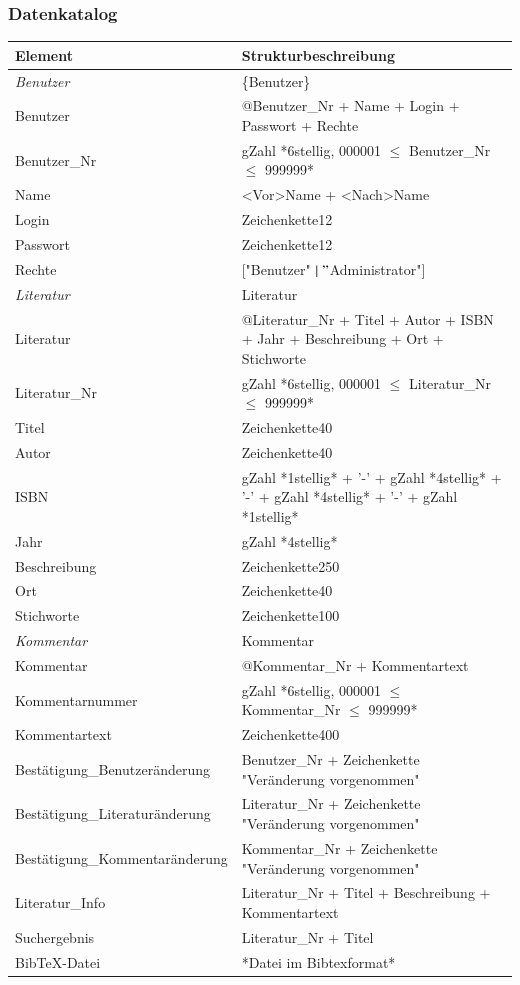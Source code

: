 \subsubsection{Datenkatalog}
\begin{tabular}[ht]{|l|p{8.5cm}|}
\hline
Element & Strukturbeschreibung \\
\hline\hline
\emph{Benutzer} & \{Benutzer\} \\
\hline
Benutzer  & @Benutzer\_Nr + Name + Login + Passwort + Rechte \\
\hline
Benutzer\_Nr & gZahl *6stellig, 000001 $\leq$ Benutzer\_Nr $\leq$ 999999* \\ 
\hline
Name & <Vor>Name + <Nach>Name \\
\hline
Login & Zeichenkette12 \\
\hline
Passwort & Zeichenkette12 \\
\hline
Rechte & ["Benutzer" $\mid "$Administrator"] \\
\hline\hline

\emph{Literatur} & {Literatur} \\
\hline
Literatur & @Literatur\_Nr + Titel + Autor + ISBN + Jahr + Beschreibung + Ort + Stichworte \\
\hline
Literatur\_Nr & gZahl *6stellig, 000001 $\leq$ Literatur\_Nr $\leq$ 999999* \\
\hline
Titel & Zeichenkette40 \\
\hline
Autor & Zeichenkette40 \\
\hline
ISBN & gZahl *1stellig* + '-' + gZahl *4stellig* + '-' + gZahl *4stellig* + '-' + gZahl *1stellig* \\
\hline
Jahr & gZahl *4stellig* \\
\hline
Beschreibung & Zeichenkette250 \\
\hline
Ort & Zeichenkette40 \\
\hline
Stichworte & Zeichenkette100 \\
\hline\hline

\emph{Kommentar} & {Kommentar} \\
\hline
Kommentar & @Kommentar\_Nr + Kommentartext \\
\hline
Kommentarnummer & gZahl *6stellig, 000001 $\leq$ Kommentar\_Nr $\leq$ 999999* \\
\hline
Kommentartext & Zeichenkette400 \\
\hline\hline

Best\"atigung\_Benutzer\"anderung & Benutzer\_Nr + Zeichenkette "Ver\"anderung vorgenommen" \\
\hline
Best\"atigung\_Literatur\"anderung & Literatur\_Nr + Zeichenkette "Ver\"anderung vorgenommen" \\
\hline
Best\"atigung\_Kommentar\"anderung & Kommentar\_Nr + Zeichenkette "Ver\"anderung vorgenommen" \\
\hline
Literatur\_Info & Literatur\_Nr + Titel + Beschreibung + Kommentartext \\
\hline
Suchergebnis & Literatur\_Nr + Titel \\
\hline
BibTeX-Datei & *Datei im Bibtexformat* \\
\hline

\end{tabular}

